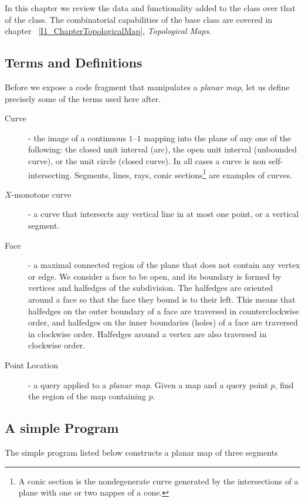 In this chapter we review the data and functionality added
to the  class over that of the 
 class. The combinatorial capabilities of
the base class are covered in chapter ~\ref{I1_ChapterTopologicalMap},
{\em Topological Maps}.

\subsection{Terms and Definitions}
Before we expose a code fragment that manipulates a {\em planar
map}, let us define precisely some of the terms used here after.

\begin{description}
\item[Curve] - the image of a continuous $1$--$1$ mapping into the
plane of any one of the following: the closed unit interval (arc), the
open unit interval (unbounded curve), or the unit circle (closed
curve). In all cases a curve is non self-intersecting. Segments,
lines, rays, conic sections\footnote{A conic section is the
nondegenerate curve generated by the intersections of a plane with
one or two nappes of a cone.} are examples of curves. 

\item[{\boldmath $X$}-monotone curve] - a curve that intersects
any vertical line in at most one point, or a vertical segment.

\item[Face] - a maximal connected region of the plane that does not
contain any vertex or edge. We consider a face to be open, and its
boundary is formed by vertices and halfedges of the subdivision.
The halfedges are oriented around a face so that the face they bound 
is to their left. This means that halfedges on the outer boundary
of a face are traversed in counterclockwise order, and halfedges on
the inner boundaries (holes) of a face are traversed in clockwise
order. Halfedges around a vertex are also traversed in clockwise order. 

\item[Point Location] - a query applied to a {\em planar map}. Given a
map and a query point $p$, find the region of the map containing $p$.
\end{description}

\subsection{A simple Program}
The simple program listed below constructs a planar map of three segments

